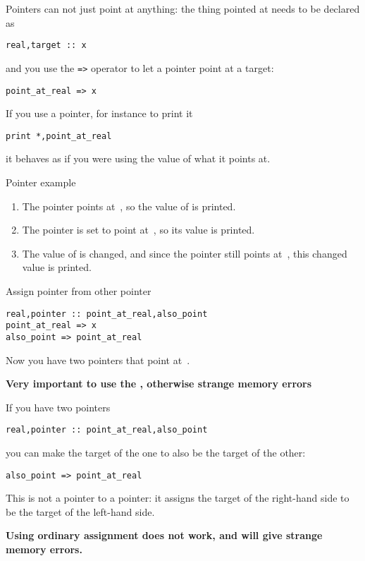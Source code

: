 Pointers can not just point at anything: the thing pointed at needs to
be declared as 
\begin{verbatim}
real,target :: x
\end{verbatim}
and you use the \verb+=>+ operator to let a pointer point at a target:
\begin{verbatim}
point_at_real => x
\end{verbatim}

If you use a pointer, for instance to print it
\begin{verbatim}
print *,point_at_real
\end{verbatim}
it behaves as if you were using the value of what it points at.

\begin{block}{Pointer example}
  \begin{enumerate}
  \item The pointer points at~, so the value of  is printed.
  \item The pointer is set to point at~, so its value is printed.
  \item The value of  is changed, and since the pointer still
    points at~, this changed value is printed.
  \end{enumerate}
\end{block}

\begin{block}{Assign pointer from other pointer}
\begin{verbatim}
real,pointer :: point_at_real,also_point
point_at_real => x
also_point => point_at_real  
\end{verbatim}
  Now you have two pointers that point at~.

  \textbf{Very important to use the \n{=>}, otherwise strange
    memory errors}
\end{block}

If you have two pointers
\begin{verbatim}
real,pointer :: point_at_real,also_point
\end{verbatim}
you can make the target of the one to also be the target of the other:
\begin{verbatim}
also_point => point_at_real  
\end{verbatim}
This is not a pointer to a pointer: it assigns the target of the
right-hand side to be the target of the left-hand side.

\textbf{Using ordinary assignment does not work, and will give strange
  memory errors.}

